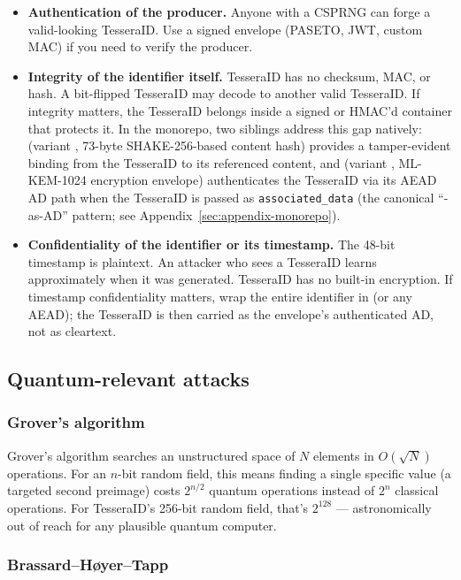 \begin{itemize}
  \item \textbf{Authentication of the producer.} Anyone with a CSPRNG can forge a valid-looking TesseraID. Use a signed envelope (PASETO, JWT, custom MAC) if you need to verify the producer.
  \item \textbf{Integrity of the identifier itself.} TesseraID has no checksum, MAC, or hash. A bit-flipped TesseraID may decode to another valid TesseraID. If integrity matters, the TesseraID belongs inside a signed or HMAC'd \citep{rfc2104} container that protects it. In the \tessera{} monorepo, two siblings address this gap natively: \tesserahash{} (variant , 73-byte SHAKE-256-based content hash) provides a tamper-evident binding from the TesseraID to its referenced content, and \tesseraseal{} (variant , ML-KEM-1024 encryption envelope) authenticates the TesseraID via its AEAD AD path when the TesseraID is passed as \texttt{associated\_data} (the canonical ``\tesseraid{}-as-AD'' pattern; see Appendix~\ref{sec:appendix-monorepo}).
  \item \textbf{Confidentiality of the identifier or its timestamp.} The 48-bit timestamp is plaintext. An attacker who sees a TesseraID learns approximately when it was generated. TesseraID has no built-in encryption. If timestamp confidentiality matters, wrap the entire identifier in \tesseraseal{} (or any AEAD); the TesseraID is then carried as the envelope's authenticated AD, not as cleartext.
\end{itemize}

\subsection{Quantum-relevant attacks}

\subsubsection{Grover's algorithm \citep{grover1996}}

Grover's algorithm searches an unstructured space of $N$ elements in $O(\sqrt{N})$ operations. For an $n$-bit random field, this means finding a single specific value (a targeted second preimage) costs $2^{n/2}$ quantum operations instead of $2^n$ classical operations. For TesseraID's 256-bit random field, that's $2^{128}$ --- astronomically out of reach for any plausible quantum computer.

\subsubsection{Brassard--H{\o}yer--Tapp \citep{bht1998}}


